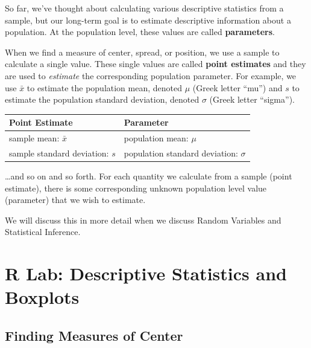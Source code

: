 \documentclass[
]{book}
\begin{document}
So far, we've thought about calculating various descriptive statistics from a sample, but our long-term goal is to estimate descriptive information about a population. At the population level, these values are called \textbf{parameters}.

When we find a measure of center, spread, or position, we use a sample to calculate a single value. These single values are called \textbf{point estimates} and they are used to \emph{estimate} the corresponding population parameter. For example, we use \(\bar{x}\) to estimate the population mean, denoted \(\mu\) (Greek letter ``mu'') and \(s\) to estimate the population standard deviation, denoted \(\sigma\) (Greek letter ``sigma'').

\begin{longtable}[]{@{}
  >{\raggedright\arraybackslash}p{}
  >{\raggedright\arraybackslash}p{}@{}}
\toprule\noalign{}
\begin{minipage}[b]{\linewidth}\raggedright
Point Estimate
\end{minipage} & \begin{minipage}[b]{\linewidth}\raggedright
Parameter
\end{minipage} \\
\midrule\noalign{}
\endhead
\bottomrule\noalign{}
\endlastfoot
sample mean: \(\bar{x}\) & population mean: \(\mu\) \\
sample standard deviation: \(s\) & population standard deviation: \(\sigma\) \\
\end{longtable}

\ldots and so on and so forth. For each quantity we calculate from a sample (point estimate), there is some corresponding unknown population level value (parameter) that we wish to estimate.

We will discuss this in more detail when we discuss Random Variables and Statistical Inference.

\section*{R Lab: Descriptive Statistics and Boxplots}\label{r-lab-descriptive-statistics-and-boxplots}

\subsection*{Finding Measures of Center}\label{finding-measures-of-center}
\end{document}
